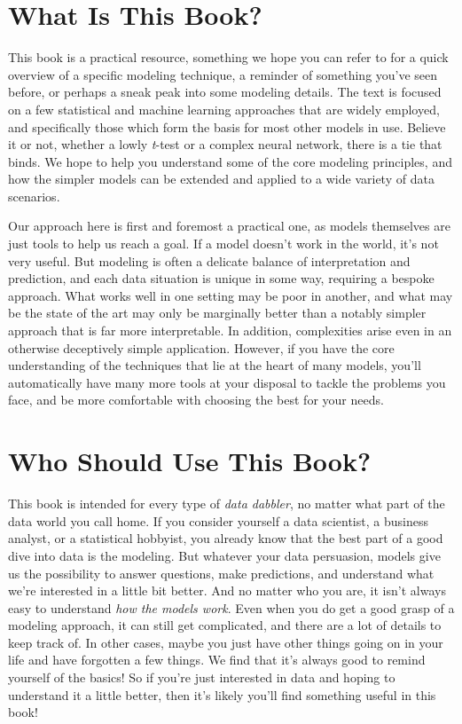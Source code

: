 \documentclass[
  letterpaper,
]{krantz}
\begin{document}
\section{What Is This Book?}\label{what-is-this-book}

This book is a practical resource, something we hope you can refer to
for a quick overview of a specific modeling technique, a reminder of
something you've seen before, or perhaps a sneak peak into some modeling
details. The text is focused on a few statistical and machine learning
approaches that are widely employed, and specifically those which form
the basis for most other models in use. Believe it or not, whether a
lowly \emph{t}-test or a complex neural network, there is a tie that
binds. We hope to help you understand some of the core modeling
principles, and how the simpler models can be extended and applied to a
wide variety of data scenarios.

Our approach here is first and foremost a practical one, as models
themselves are just tools to help us reach a goal. If a model doesn't
work in the world, it's not very useful. But modeling is often a
delicate balance of interpretation and prediction, and each data
situation is unique in some way, requiring a bespoke approach. What
works well in one setting may be poor in another, and what may be the
state of the art may only be marginally better than a notably simpler
approach that is far more interpretable. In addition, complexities arise
even in an otherwise deceptively simple application. However, if you
have the core understanding of the techniques that lie at the heart of
many models, you'll automatically have many more tools at your disposal
to tackle the problems you face, and be more comfortable with choosing
the best for your needs.

\section{Who Should Use This Book?}\label{who-should-use-this-book}

This book is intended for every type of \emph{data dabbler}, no matter
what part of the data world you call home. If you consider yourself a
data scientist, a business analyst, or a statistical hobbyist, you
already know that the best part of a good dive into data is the
modeling. But whatever your data persuasion, models give us the
possibility to answer questions, make predictions, and understand what
we're interested in a little bit better. And no matter who you are, it
isn't always easy to understand \emph{how the models work}. Even when
you do get a good grasp of a modeling approach, it can still get
complicated, and there are a lot of details to keep track of. In other
cases, maybe you just have other things going on in your life and have
forgotten a few things. We find that it's always good to remind yourself
of the basics! So if you're just interested in data and hoping to
understand it a little better, then it's likely you'll find something
useful in this book!
\end{document}
